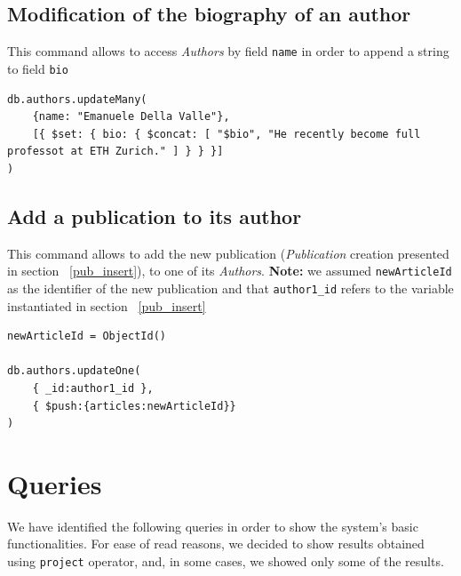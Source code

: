 \documentclass{Configuration_Files/PoliMi3i_thesis}
\begin{document}
\subsection{Modification of the biography of an author}
This command allows to access \emph{Authors} by field \verb |name| in order to append a string to field \verb |bio|
\begin{lstlisting}
db.authors.updateMany(
	{name: "Emanuele Della Valle"},
	[{ $set: { bio: { $concat: [ "$bio", "He recently become full professot at ETH Zurich." ] } } }]
)
\end{lstlisting}

\subsection{Add a publication to its author}
This command allows to add the new publication (\emph{Publication} creation presented in section ~\ref{pub_insert}), to
one of its \emph{Authors}. \newline
\textbf{Note:} we assumed \verb |newArticleId| as the identifier of the new publication and that \verb |author1_id|
refers to the variable instantiated in section ~\ref{pub_insert}
\begin{lstlisting}
newArticleId = ObjectId()

db.authors.updateOne(
	{ _id:author1_id },
	{ $push:{articles:newArticleId}}
)
\end{lstlisting}


\newpage
\section{Queries}
We have identified the following queries in order to show the system's basic functionalities.\newline
For ease of read reasons, we decided to show results obtained using \verb |project| operator, and, in some cases,
we showed only some of the results.
\end{document}
